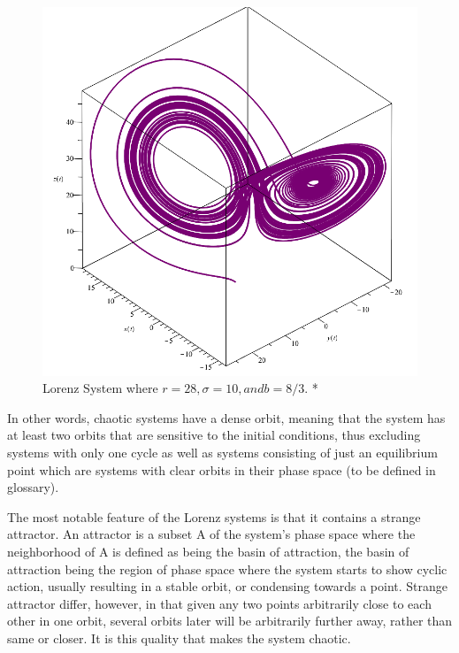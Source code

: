 \begin{figure}[H]
    \centering
	\includegraphics[width=\linewidth]{Figures/lorenz2.PNG}
	\caption{Lorenz System where $r = 28, \sigma = 10, and b = 8/3$. *}
	\label{fig:genLorenz}
\end{figure}

\par In other words, chaotic systems have a dense orbit, meaning that the system has at least two orbits that are sensitive to the initial conditions, thus excluding systems with only one cycle as well as systems consisting of just an equilibrium point which are systems with clear orbits in their phase space (to be defined in glossary). 

\par The most notable feature of the Lorenz systems is that it contains a strange attractor.  An attractor is a subset A of the system's phase space where the neighborhood of A is defined as being the basin of attraction, the basin of attraction being the region of phase space where the system starts to show cyclic action, usually resulting in a stable orbit, or condensing towards a point.  Strange attractor differ, however, in that given any two points arbitrarily close to each other in one orbit, several orbits later will be arbitrarily further away, rather than same or closer.  It is this quality that makes the system chaotic.

